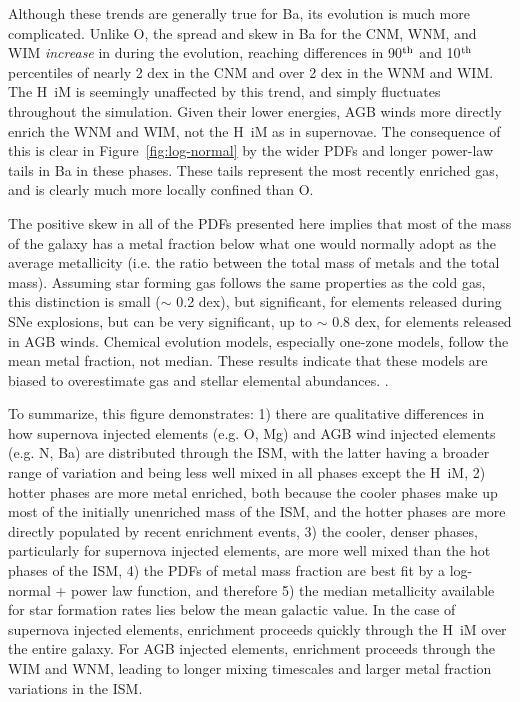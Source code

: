 \documentclass[twocolumn]{aastex61}
\begin{document}

Although these trends are generally true for Ba, its evolution is much more complicated.
Unlike O, the spread and skew in Ba for the CNM, WNM, and WIM \textit{increase} in during the evolution, reaching differences in 90$^{\rm th}$ and 10$^{\rm th}$ percentiles of nearly 2 dex in the CNM and over 2 dex in the WNM and WIM. The H~{\sc i}M is seemingly unaffected by this trend, and simply fluctuates throughout the simulation. Given their lower energies, AGB winds more directly enrich the WNM and WIM, not the H~{\sc i}M as in supernovae. The consequence of this is clear in Figure~\ref{fig:log-normal} by the wider PDFs and longer power-law tails in Ba in these phases. These tails represent the most recently enriched gas, and is clearly much more locally confined than O.

The positive skew in all of the PDFs presented here implies that most of the mass of the galaxy has a metal fraction below what one would normally adopt as the average metallicity (i.e. the ratio between the total mass of metals and the total mass). Assuming star forming gas follows the same properties as the cold gas, this distinction is small ($\sim$ 0.2 dex), but significant, for elements released during SNe explosions, but can be very significant, up to $\sim$ 0.8 dex, for elements released in AGB winds. Chemical evolution models, especially one-zone models, follow the mean metal fraction, not median. These results indicate that these models are biased to overestimate gas and stellar elemental abundances.
. %

To summarize, this figure demonstrates: 1) there are qualitative differences in how supernova injected elements (e.g. O, Mg) and AGB wind injected elements (e.g. N, Ba) are distributed through the ISM, with the latter having a broader range of variation and being less well mixed in all phases except the H~{\sc i}M, 2) hotter phases are more metal enriched, both because the cooler phases make up most of the initially unenriched mass of the ISM, and the hotter phases are more directly populated by recent enrichment events, 3) the cooler, denser phases, particularly for supernova injected elements, are more well mixed than the hot phases of the ISM, 4) the PDFs of metal mass fraction are best fit by a log-normal + power law function, and therefore 5) the median metallicity available for star formation rates lies below the mean galactic value. In the case of supernova injected elements, enrichment proceeds quickly through the H~{\sc i}M over the entire galaxy. For AGB injected elements, enrichment proceeds through the WIM and WNM, leading to longer mixing timescales and larger metal fraction variations in the ISM.
\end{document}
